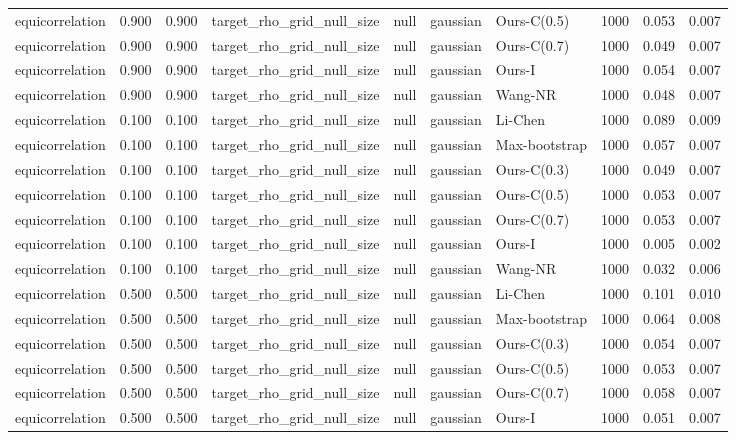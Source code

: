 \begin{tabular}{lrrllllrrr}
equicorrelation & 0.900 & 0.900 & target\_rho\_grid\_null\_size & null & gaussian & Ours-C(0.5) & 1000 & 0.053 & 0.007 \\
equicorrelation & 0.900 & 0.900 & target\_rho\_grid\_null\_size & null & gaussian & Ours-C(0.7) & 1000 & 0.049 & 0.007 \\
equicorrelation & 0.900 & 0.900 & target\_rho\_grid\_null\_size & null & gaussian & Ours-I & 1000 & 0.054 & 0.007 \\
equicorrelation & 0.900 & 0.900 & target\_rho\_grid\_null\_size & null & gaussian & Wang-NR & 1000 & 0.048 & 0.007 \\
equicorrelation & 0.100 & 0.100 & target\_rho\_grid\_null\_size & null & gaussian & Li-Chen & 1000 & 0.089 & 0.009 \\
equicorrelation & 0.100 & 0.100 & target\_rho\_grid\_null\_size & null & gaussian & Max-bootstrap & 1000 & 0.057 & 0.007 \\
equicorrelation & 0.100 & 0.100 & target\_rho\_grid\_null\_size & null & gaussian & Ours-C(0.3) & 1000 & 0.049 & 0.007 \\
equicorrelation & 0.100 & 0.100 & target\_rho\_grid\_null\_size & null & gaussian & Ours-C(0.5) & 1000 & 0.053 & 0.007 \\
equicorrelation & 0.100 & 0.100 & target\_rho\_grid\_null\_size & null & gaussian & Ours-C(0.7) & 1000 & 0.053 & 0.007 \\
equicorrelation & 0.100 & 0.100 & target\_rho\_grid\_null\_size & null & gaussian & Ours-I & 1000 & 0.005 & 0.002 \\
equicorrelation & 0.100 & 0.100 & target\_rho\_grid\_null\_size & null & gaussian & Wang-NR & 1000 & 0.032 & 0.006 \\
equicorrelation & 0.500 & 0.500 & target\_rho\_grid\_null\_size & null & gaussian & Li-Chen & 1000 & 0.101 & 0.010 \\
equicorrelation & 0.500 & 0.500 & target\_rho\_grid\_null\_size & null & gaussian & Max-bootstrap & 1000 & 0.064 & 0.008 \\
equicorrelation & 0.500 & 0.500 & target\_rho\_grid\_null\_size & null & gaussian & Ours-C(0.3) & 1000 & 0.054 & 0.007 \\
equicorrelation & 0.500 & 0.500 & target\_rho\_grid\_null\_size & null & gaussian & Ours-C(0.5) & 1000 & 0.053 & 0.007 \\
equicorrelation & 0.500 & 0.500 & target\_rho\_grid\_null\_size & null & gaussian & Ours-C(0.7) & 1000 & 0.058 & 0.007 \\
equicorrelation & 0.500 & 0.500 & target\_rho\_grid\_null\_size & null & gaussian & Ours-I & 1000 & 0.051 & 0.007 \\

\end{tabular}
